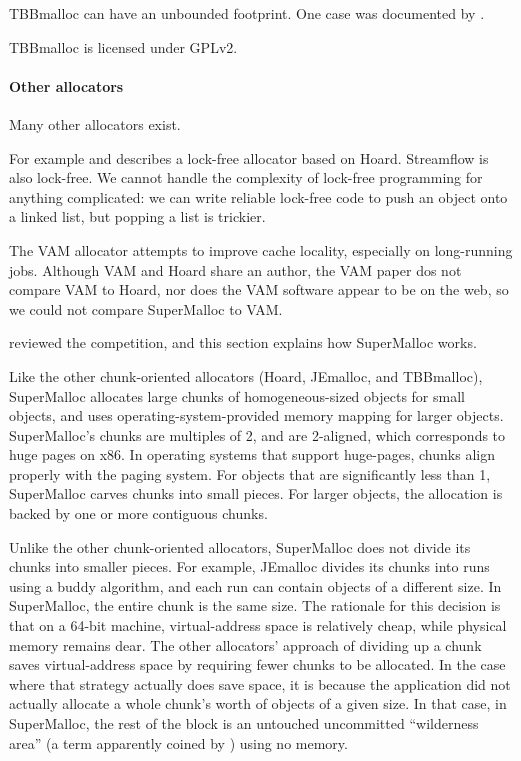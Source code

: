 \documentclass[pldi]{sigplanconf-pldi15}
\begin{document}
TBBmalloc can have an unbounded footprint.  One case was documented by
\cite{Vyukov08}.

TBBmalloc is licensed under GPLv2.

{\paragraph{Other allocators}} Many other allocators exist. 

For example \cite{Michael04} and describes a lock-free allocator based
on Hoard.  Streamflow \cite{SchneiderAnNi06} is also lock-free.  We
cannot handle the complexity of lock-free programming for anything
complicated: we can write reliable lock-free code to push an object
onto a linked list, but popping a list is trickier.

The VAM allocator \cite{FengBe05} attempts to improve cache locality,
especially on long-running jobs.  Although VAM and Hoard share an
author, the VAM paper dos not compare VAM to Hoard, nor does the VAM
software appear to be on the web, so we could not compare SuperMalloc
to VAM\@.


 reviewed the competition, and this section explains how
SuperMalloc works.   

Like the other chunk-oriented allocators (Hoard, JEmalloc, and
TBBmalloc), SuperMalloc allocates large chunks of homogeneous-sized
objects for small objects, and uses operating-system-provided memory
mapping for larger objects.  SuperMalloc's chunks are multiples of
\unit{2}\mebi\byte, and are \unit{2}\mebi\byte{}-aligned, which
corresponds to huge pages on x86.  In operating systems that support
huge-pages, chunks align properly with the paging system.  For objects
that are significantly less than \unit{1}\mebi\byte{}, SuperMalloc
carves chunks into small pieces.  For larger objects, the allocation
is backed by one or more contiguous chunks.

Unlike the other chunk-oriented allocators, SuperMalloc does not
divide its chunks into smaller pieces.  For example, JEmalloc divides
its chunks into runs using a buddy algorithm, and each run can contain
objects of a different size.  In SuperMalloc, the entire chunk is the
same size.  The rationale for this decision is that on a 64-bit
machine, virtual-address space is relatively cheap, while physical
memory remains dear.  The other allocators' approach of dividing up a
chunk saves virtual-address space by requiring fewer chunks to be
allocated.  In the case where that strategy actually does save space,
it is because the application did not actually allocate a whole
chunk's worth of objects of a given size.  In that case, in
SuperMalloc, the rest of the block is an untouched uncommitted
``wilderness area'' (a term apparently coined by \cite{KornVo85})
using no memory.
\end{document}
